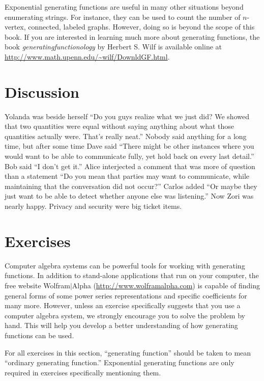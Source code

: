 Exponential generating functions are useful in many other situations
beyond enumerating strings. For instance, they can be used to count
the number of $n$-vertex, connected, labeled graphs. However, doing so
is beyond the scope of this book. If you are interested in learning
much more about generating functions, the book
\emph{generatingfunctionology} by Herbert S. Wilf is available online
at \url{http://www.math.upenn.edu/~wilf/DownldGF.html}.

\section{Discussion}

Yolanda was beside herself ``Do you guys realize what we just
did?  We showed that two quantities were equal without saying
anything about what those quantities actually were.  That's really
neat.''  Nobody said anything for a long time, but after some time
Dave said ``There might be other instances where you would
want to be able to communicate fully, yet hold back on every
last detail.''  Bob said ``I don't get it.''  Alice interjected
a comment that was more of question than a statement ``Do you
mean that parties may want to communicate, while maintaining
that the conversation did not occur?''  Carlos added ``Or maybe
they just want to be able to detect whether anyone else was
listening.''  Now Zori was nearly happy.  Privacy and security were
big ticket items.

\section{Exercises}

Computer algebra systems can be powerful tools for working with
generating functions. In addition to stand-alone applications that run
on your computer, the free website Wolfram$|$Alpha
(\url{http://www.wolframalpha.com}) is capable of finding general
forms of some power series representations and specific coefficients
for many more. However, unless an exercise specifically suggests that
you use a computer algebra system, we strongly encourage you to solve
the problem by hand. This will help you develop a better understanding
of how generating functions can be used.

For all exercises in this section, ``generating function'' should be
taken to mean ``ordinary generating function.'' Exponential generating
functions are only required in exercises specifically mentioning them.

